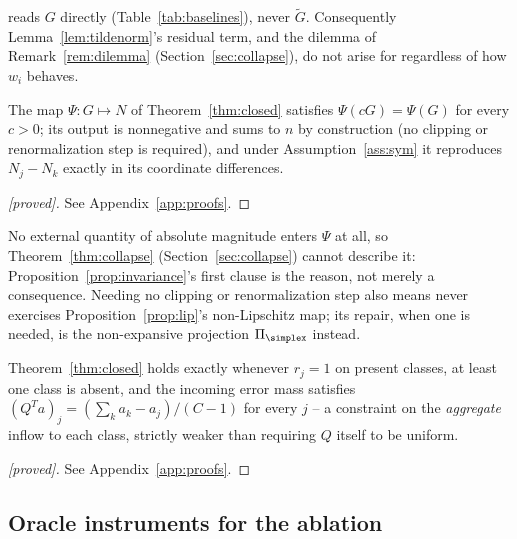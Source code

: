 \begin{corollary}
\label{cor:no-branch}
\ourmethod{} reads $G$ directly (Table~\ref{tab:baselines}), never
$\widetilde G$. Consequently Lemma~\ref{lem:tildenorm}'s residual term,
and the dilemma of Remark~\ref{rem:dilemma} (Section~\ref{sec:collapse}),
do not arise for \ourmethod{} regardless of how $w_i$ behaves.
\end{corollary}

\begin{proposition}
\label{prop:invariance}
The map $\Psi: G \mapsto N$ of Theorem~\ref{thm:closed} satisfies
$\Psi(cG)=\Psi(G)$ for every $c>0$; its output is nonnegative and sums to
$n$ by construction (no clipping or renormalization step is required),
and under Assumption~\ref{ass:sym} it reproduces $N_j - N_k$ exactly in
its coordinate differences.
\end{proposition}

\begin{proof}[\textnormal{[proved]}]
See Appendix~\ref{app:proofs}.
\end{proof}

No external quantity of absolute magnitude enters $\Psi$ at all, so
Theorem~\ref{thm:collapse} (Section~\ref{sec:collapse}) cannot describe
it: Proposition~\ref{prop:invariance}'s first clause is the reason, not
merely a consequence. Needing no clipping or renormalization step also
means \ourmethod{} never exercises Proposition~\ref{prop:lip}'s
non-Lipschitz map; its repair, when one is needed, is the non-expansive
projection $\Pi_\simplex$ instead.

\begin{proposition}
\label{prop:weak}
Theorem~\ref{thm:closed} holds exactly whenever $r_j=1$ on present
classes, at least one class is absent, and the incoming error mass
satisfies $(Q^Ta)_j = (\sum_k a_k - a_j)/(C-1)$ for every $j$ -- a
constraint on the \emph{aggregate} inflow to each class, strictly weaker
than requiring $Q$ itself to be uniform.
\end{proposition}

\begin{proof}[\textnormal{[proved]}]
See Appendix~\ref{app:proofs}.
\end{proof}

\subsection{Oracle instruments for the ablation}
\label{sec:method-oracle}

